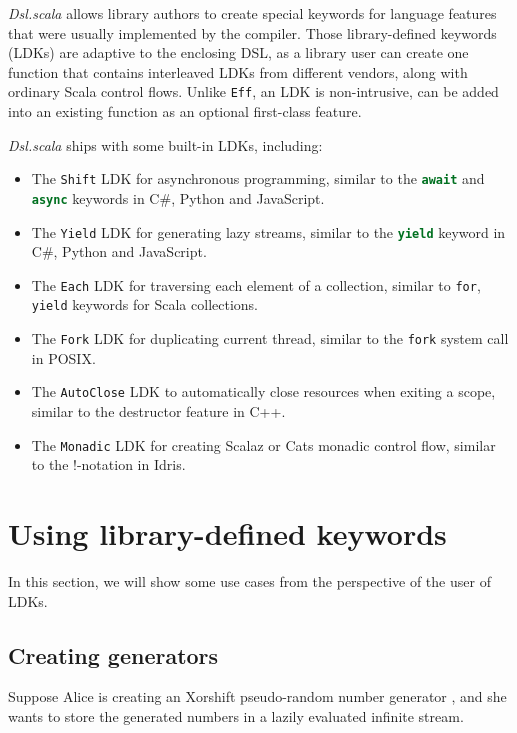 \textit{Dsl.scala} allows library authors to create special keywords for language features that were usually implemented by the compiler. Those library-defined keywords (LDKs) are adaptive to the enclosing DSL, as a library user can create one function that contains interleaved LDKs from different vendors, along with ordinary Scala control flows. Unlike \lstinline{Eff}, an LDK is non-intrusive, can be added into an existing function as an optional first-class feature.

\textit{Dsl.scala} ships with some built-in LDKs, including:
\begin{itemize}
  \item The \lstinline{Shift} LDK for asynchronous programming, similar to the \lstinline[language=Python]{await} and \lstinline[language=Python]{async} keywords in C\#, Python and JavaScript.
  \item The \lstinline{Yield} LDK for generating lazy streams, similar to the \lstinline[language=Python]{yield} keyword in C\#, Python and JavaScript.
  \item The \lstinline{Each} LDK for traversing each element of a collection, similar to \lstinline{for}, \lstinline{yield} keywords for Scala collections.
  \item The \lstinline{Fork} LDK for duplicating current thread, similar to the \lstinline{fork} system call in POSIX.
  \item The \lstinline{AutoClose} LDK to automatically close resources when exiting a scope, similar to the destructor feature in C++.
  \item The \lstinline{Monadic} LDK for creating Scalaz \cite{kenji2017scalaz} or Cats \cite{typelevel2017cats} monadic control flow, similar to the !-notation in Idris\cite{brady2013idris}.
\end{itemize}
 
\section{Using library-defined keywords}\label{Using library-defined keywords}

In this section, we will show some use cases from the perspective of the user of LDKs.

\subsection{Creating generators}\label{Creating generators}

Suppose Alice is creating an Xorshift pseudo-random number generator \cite{marsaglia2003xorshift}, and she wants to store the generated numbers in a lazily evaluated infinite stream. 

